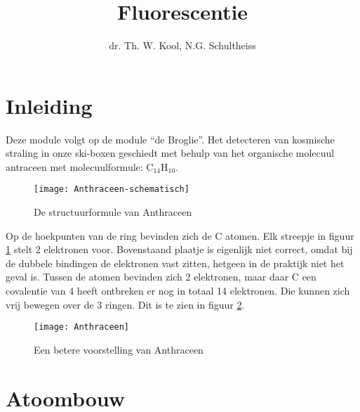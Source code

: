 



\title{Fluorescentie}
\author{dr. Th. W. Kool, N.G. Schultheiss }
\date{}

\maketitle
\thispagestyle{firststyle}

\section{Inleiding}

Deze module volgt op de module ``de Broglie''. Het detecteren van
kosmische straling in onze ski-boxen geschiedt met behulp van het
organische molecuul antraceen met molecuulformule: $\mathrm{C}_{14}\mathrm{H}_{10}$.

\begin{figure}[h]
\noindent \begin{centering}
\texttt{[image: Anthraceen-schematisch]}
\par\end{centering}

\caption{\label{fig:Structuurformule-Anthraceen}De structuurformule van Anthraceen}
\end{figure}


Op de hoekpunten van de ring bevinden zich de C atomen. Elk streepje
in figuur \ref{fig:Structuurformule-Anthraceen} stelt 2 elektronen
voor. Bovenstaand plaatje is eigenlijk niet correct, omdat bij de
dubbele bindingen de elektronen vast zitten, hetgeen in de praktijk
niet het geval is. Tussen de atomen bevinden zich 2 elektronen, maar
daar C een covalentie van 4 heeft ontbreken er nog in totaal 14 elektronen.
Die kunnen zich vrij bewegen over de 3 ringen. Dit is te zien in figuur
\ref{fig:Anthraceen2}.

\begin{figure}[h]
\noindent \begin{centering}
\texttt{[image: Anthraceen]}
\par\end{centering}

\caption{\label{fig:Anthraceen2}Een betere voorstelling van Anthraceen}
\end{figure}



\section{Atoombouw}


